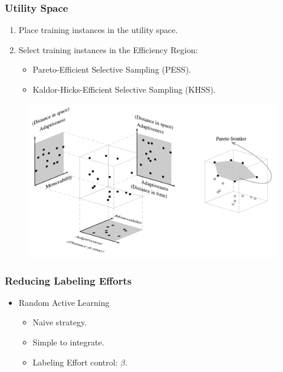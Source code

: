 \documentclass[14pt]{beamer}
\begin{document}
\begin{frame}\frametitle{Utility Space}

\begin{enumerate}
\item Place training instances in the utility space.
\item Select training instances in the Efficiency Region:
\begin{itemize}
\item Pareto-Efficient Selective Sampling (PESS).
\item Kaldor-Hicks-Efficient Selective Sampling (KHSS).
\end{itemize}
\end{enumerate}

\vspace{-0.1in}
\begin{figure}
\centering
\includegraphics[scale=0.43]{pareto}
\end{figure}

\end{frame}

\begin{frame}\frametitle{Reducing Labeling Efforts}
\begin{itemize}
\item Random Active Learning
\begin{itemize}
\item Naive strategy.
\item Simple to integrate.
\item Labeling Effort control: $\beta$.
\end{itemize}
\end{itemize}
\end{frame}
\end{document}
